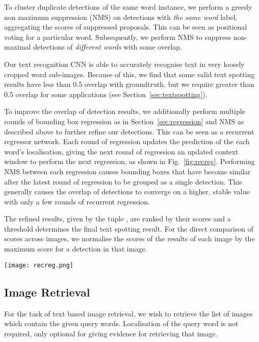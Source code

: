 \documentclass[twocolumn]{svjour3}          \smartqed  \usepackage{epsfig}
\begin{document}
To cluster duplicate detections of the same word instance, we perform a greedy non maximum suppression (NMS) on detections with \emph{the same word} label, aggregating the scores of suppressed proposals. This can be seen as positional voting for a particular word. Subsequently, we perform NMS to suppress non-maximal detections of \emph{different words} with some overlap.

Our text recognition CNN is able to accurately recognise text in very loosely cropped word sub-images. Because of this, we find that some valid text spotting results have less than 0.5 overlap with groundtruth, but we require greater than 0.5 overlap for some applications (see Section~\ref{sec:textspotting}). 

To improve the overlap of detection results, we additionally perform multiple rounds of bounding box regression as in Section~\ref{sec:regression} and NMS as described above to further refine our detections. This can be seen as a recurrent regressor network. Each round of regression updates the prediction of the each word's localisation, giving the next round of regression an updated context window to perform the next regression, as shown in Fig.~\ref{fig:recreg}. Performing NMS between each regression causes bounding boxes that have become similar after the latest round of regression to be grouped as a single detection. This generally causes the overlap of detections to converge on a higher, stable value with only a few rounds of recurrent regression.

The refined results, given by the tuple , are ranked by their scores  and a threshold determines the final text spotting result. For the direct comparison of scores across images, we normalise the scores of the results of each image by the maximum score for a detection in that image.

\begin{figure*}
\begin{center}
\texttt{[image: recreg.png]} 
\caption{An example of the improvement in localisation of the word detection \texttt{pharmacy} through multiple rounds of recurrent regression.}
\label{fig:recreg}
\end{center}
\end{figure*}

\subsection{Image Retrieval}
For the task of text based image retrieval, we wish to retrieve the list of images which contain the given query words. Localisation of the query word is not required, only optional for giving evidence for retrieving that image. 
\end{document}
